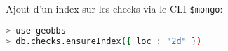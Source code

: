 \documentclass[a4paper,12pt]{report}
\begin{document}
\begin{onehalfspace}
Ajout d'un index sur les checks via le CLI \lstinline{$mongo}:
\begin{lstlisting}[float=htb, language=bash, frame=lines, caption={Commandes à entrer dans le CLI mongo}, label={code:cliMongo}]
> use geobbs
> db.checks.ensureIndex({ loc : "2d" })
\end{lstlisting}

%
%
%
%
%
%
%
%








  \end{onehalfspace}
\end{document}
